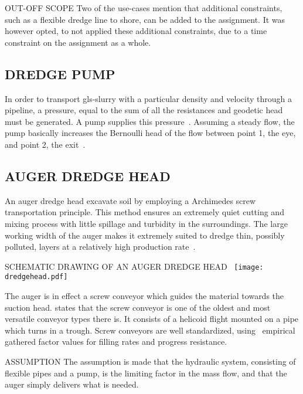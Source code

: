 \begin{RoyalNote}{OUT-OFF SCOPE}
    Two of the use-cases mention that additional constraints, such as a flexible dredge line to shore, can be added 
    to the assignment. It was however opted, to not applied these additional constraints, due to a time constraint on
    the assignment as a whole.
\end{RoyalNote}

\subsection{DREDGE PUMP}
In order to transport \gls{gls-slurry} with a particular density and velocity through a pipeline, a pressure, equal to
the sum of all the resistances and geodetic head must be generated. A pump supplies this
pressure~\cite{van_den_berg_ihc_2013}. Assuming a steady flow, the pump basically increases the Bernoulli head of the
flow between point 1, the eye, and point 2, the exit~\cite{white_fluid_2011}.

\subsection{AUGER DREDGE HEAD}
An auger dredge head excavate soil by employing a Archimedes screw transportation principle. This method ensures an
extremely quiet cutting and mixing process with little spillage and turbidity in the surroundings. The large working
width of the auger makes it extremely suited to dredge thin, possibly polluted, layers at a relatively high production
rate~\cite{van_der_schrieck_dredging_2014}.

\begin{RoyalFigure}[htb, label=fig:dredge_head]{SCHEMATIC DRAWING OF AN AUGER DREDGE 
HEAD~\cite{wetering_ihc_mti_crawler_dredger_final_report_2018} }
    \texttt{[image: dredgehead.pdf]}
\end{RoyalFigure}

The auger is in effect a screw conveyor which guides the material towards the suction head. \citet{perry_2007} states
that the screw conveyor is one of the oldest and most versatile conveyor types there is. It consists of a helicoid
flight mounted on a pipe which turns in a trough. Screw conveyors are well standardized,
using~\citet{international_standard_iso_neniso_1981} empirical gathered factor values for filling rates and progress
resistance.

\begin{RoyalNote}[label=assumption_dredge_speed]{ASSUMPTION}
    The assumption is made that the hydraulic system, consisting of flexible pipes and a pump, is the limiting factor
    in the mass flow, and that the auger simply delivers what is needed.
\end{RoyalNote}
